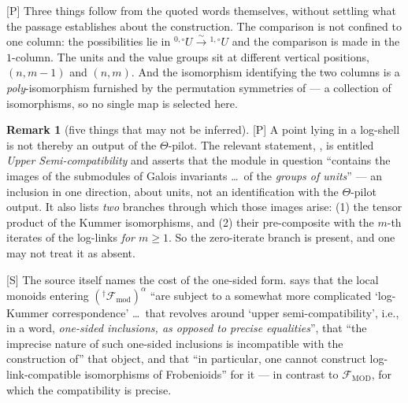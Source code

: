 \documentclass[11pt]{article}
\theoremstyle{plain}
\theoremstyle{definition}
\newtheorem{remark}{Remark}
\begin{document}
\textup{[P]} Three things follow from the quoted words themselves, without settling
what the passage establishes about the construction.
The comparison is not confined to one column: the possibilities lie in
${}^{0,\circ}U\xrightarrow{\sim}{}^{1,\circ}U$ and the comparison is made in the
$1$-column.  The units and the value groups sit at different vertical positions,
$(n,m-1)$ and $(n,m)$.  And the isomorphism identifying the two columns is
a \emph{poly}-isomorphism furnished by the permutation symmetries of
\cite[Thm.~3.11(i)]{IUT3} --- a collection of isomorphisms, so no single map is
selected here.

\begin{remark}[five things that may not be inferred]
\textup{[P]} A point lying in a log-shell is not thereby an output of the
$\Theta$-pilot.  The relevant statement, \cite[Prop.~3.5(ii)(a)]{IUT3}, is entitled
\emph{Upper Semi-compatibility} and asserts that the module in question ``contains
the images of the submodules of Galois invariants \dots\ of the \emph{groups of
units}'' --- an inclusion in one direction, about units, not an identification with
the $\Theta$-pilot output.  It also lists \emph{two} branches through which those
images arise: (1) the tensor product of the Kummer isomorphisms, and (2) their
pre-composite with the $m$-th iterates of the log-links \emph{for $m\ge1$}.  So the
zero-iterate branch is present, and one may not treat it as absent.

\textup{[S]} The source itself names the cost of the one-sided form.
\cite[Rem.~3.10.1(i)]{IUT3} says that the local monoids entering
$(^\dagger\mathcal F_{\mathrm{mod}})^\alpha$ ``are subject to a somewhat more
complicated `log-Kummer correspondence' \dots\ that revolves around `upper
semi-compatibility', i.e., in a word, \emph{one-sided inclusions, as opposed to
precise equalities}'', that ``the imprecise nature of such one-sided inclusions is
incompatible with the construction of'' that object, and that ``in particular, one
cannot construct log-link-compatible isomorphisms of Frobenioids'' for it --- in
contrast to $\mathcal F_{\mathrm{MOD}}$, for which the compatibility is precise.


\end{remark}
\end{document}
